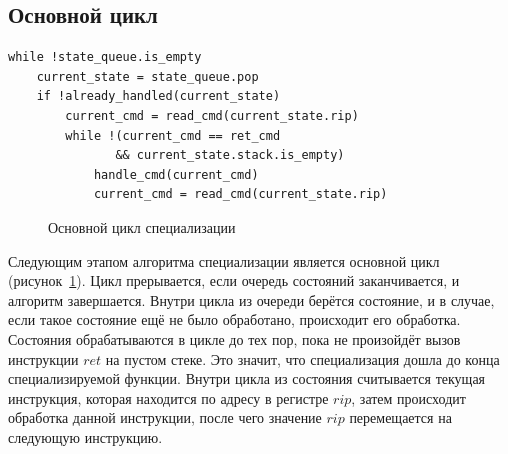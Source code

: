 \subsection{Основной цикл}
\newsavebox\boxzero
\begin{lrbox}{\boxzero}
\begin{lstlisting}[xleftmargin = 20pt]
while !state_queue.is_empty
    current_state = state_queue.pop
    if !already_handled(current_state)
        current_cmd = read_cmd(current_state.rip)
        while !(current_cmd == ret_cmd 
               && current_state.stack.is_empty)
            handle_cmd(current_cmd)
            current_cmd = read_cmd(current_state.rip)
\end{lstlisting}
\end{lrbox}
\begin{figure}[!t]
\centering
\subfloat{\usebox\boxzero}
\caption{Основной цикл специализации\label{fig:cycle}}
\end{figure}
Следующим этапом алгоритма специализации является основной цикл (рисунок~\ref{fig:cycle}).
Цикл прерывается, если очередь состояний заканчивается, и алгоритм завершается.
Внутри цикла из очереди берётся состояние, и в случае, если такое состояние ещё не было обработано, происходит его обработка.
Состояния обрабатываются в цикле до тех пор, пока не произойдёт вызов инструкции $ret$ на пустом стеке.
Это значит, что специализация дошла до конца специализируемой функции. Внутри цикла из состояния считывается текущая инструкция, которая находится по адресу в регистре $rip$, затем происходит обработка данной инструкции, после чего значение $rip$ перемещается на следующую инструкцию.

